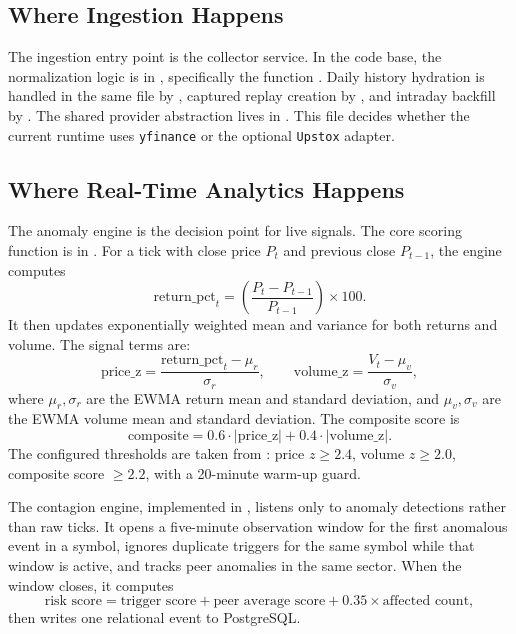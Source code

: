 \documentclass[11pt,a4paper]{article}
\begin{document}
\subsection{Where Ingestion Happens}
The ingestion entry point is the collector service. In the code base, the normalization logic is in , specifically the function . Daily history hydration is handled in the same file by , captured replay creation by , and intraday backfill by . The shared provider abstraction lives in . This file decides whether the current runtime uses \texttt{yfinance} or the optional \texttt{Upstox} adapter.

\subsection{Where Real-Time Analytics Happens}
The anomaly engine is the decision point for live signals. The core scoring function is  in . For a tick with close price \(P_t\) and previous close \(P_{t-1}\), the engine computes
\[
\text{return\_pct}_t = \left(\frac{P_t - P_{t-1}}{P_{t-1}}\right) \times 100.
\]
It then updates exponentially weighted mean and variance for both returns and volume. The signal terms are:
\[
\text{price\_z} = \frac{\text{return\_pct}_t - \mu_r}{\sigma_r},
\qquad
\text{volume\_z} = \frac{V_t - \mu_v}{\sigma_v},
\]
where \(\mu_r,\sigma_r\) are the EWMA return mean and standard deviation, and \(\mu_v,\sigma_v\) are the EWMA volume mean and standard deviation. The composite score is
\[
\text{composite} = 0.6 \cdot |\text{price\_z}| + 0.4 \cdot |\text{volume\_z}|.
\]
The configured thresholds are taken from : price \(z \geq 2.4\), volume \(z \geq 2.0\), composite score \(\geq 2.2\), with a 20-minute warm-up guard.

The contagion engine, implemented in , listens only to anomaly detections rather than raw ticks. It opens a five-minute observation window for the first anomalous event in a symbol, ignores duplicate triggers for the same symbol while that window is active, and tracks peer anomalies in the same sector. When the window closes, it computes
\[
\text{risk score} = \text{trigger score} + \text{peer average score} + 0.35 \times \text{affected count},
\]
then writes one relational event to PostgreSQL.
\end{document}
